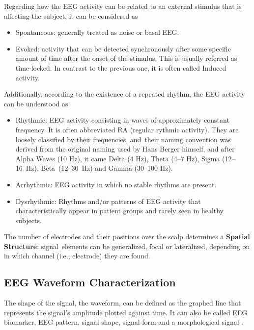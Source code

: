 \documentclass[brainsci,article,accept,moreauthors,pdftex,10pt,a4paper]{mdpi}
\begin{document}
Regarding how the EEG activity can be related to an external stimulus that is affecting the subject, it can be considered as

\begin{itemize}[leftmargin=*,labelsep=5.8mm]
\item Spontaneous: generally treated as noise or basal EEG.
\item Evoked: activity that can be detected synchronously after some specific amount of time after the onset of the stimulus.  This is usually referred as time-locked.  In contrast to the previous one, it is often called Induced activity.
\end{itemize}

\noindent Additionally, according to the existence of a repeated rhythm, the EEG activity can be understood as

\begin{itemize}[leftmargin=*,labelsep=5.8mm]
\item Rhythmic: EEG activity consisting in waves of approximately constant frequency.  It is often abbreviated RA (regular rythmic activity). They are loosely classified by their frequencies, and~their naming convention was derived from the original naming used by Hans Berger himself, and after Alpha Waves (10 Hz), it came Delta (4 Hz), Theta (4--7 Hz), Sigma (12--16~Hz), Beta~(12--30~Hz) and Gamma (30--100 Hz).  
\item Arrhythmic: EEG activity in which no stable rhythms are present.  
\item Dysrhythmic: Rhythms and/or patterns of EEG activity that characteristically appear in patient groups and rarely seen in healthy subjects.
\end{itemize}

The number of electrodes and their positions over the scalp determines a \textbf{Spatial Structure}: signal~elements can be generalized, focal or lateralized, depending on in which channel (i.e., electrode) they are found.



\subsection*{EEG Waveform Characterization}

The shape of the signal, the waveform, can be defined as the graphed line that represents the signal's amplitude plotted against time. It can also be called EEG biomarker,  EEG pattern, signal shape, signal form and a morphological signal \citep{Jansen1991}.
\end{document}
